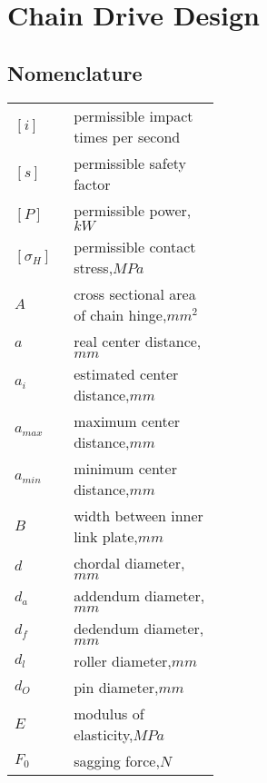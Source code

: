 \chapter{Chain Drive Design}
\section*{Nomenclature}
\begin{tabular}[t]{p{0.05\linewidth}p{0.4\linewidth}}
	$ [i] $ & permissible impact times per second\\
	$ [s] $ & permissible safety factor\\
	$ [P] $ & permissible power,$ \unit{kW} $\\
	$ [\sigma_H] $ & permissible contact stress,$ \unit{MPa} $\\
	$ A $ & cross sectional area of chain hinge,$ \unit{mm^2} $\\
	$ a $ & real center distance,$ \unit{mm} $\\
	$ a_i $ & estimated center distance,$ \unit{mm} $\\
	$ a_{max} $ & maximum center distance,$ \unit{mm} $\\
	$ a_{min} $ & minimum center distance,$ \unit{mm} $\\
	$ B $ & width between inner link plate,$ \unit{mm} $\\
	$ d $ & chordal diameter,$ \unit{mm} $\\
	$ d_a $ & addendum diameter,$ \unit{mm} $\\
	$ d_f $ & dedendum diameter,$ \unit{mm} $\\
	$ d_l $ & roller diameter,$ \unit{mm} $\\
	$ d_O $ & pin diameter,$ \unit{mm} $\\
	$ E $ & modulus of elasticity,$ \unit{MPa} $\\
	$ F_0 $ & sagging force,$ \unit{N} $\\
\end{tabular}%
